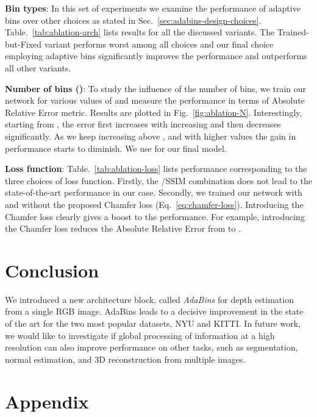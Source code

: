 \documentclass[final]{cvpr}
\begin{document}
\textbf{Bin types}:
In this set of experiments we examine the performance of adaptive bins over other choices as stated in Sec.~\ref{sec:adabins-design-choices}. Table.~\ref{tab:ablation-arch} lists results for all the discussed variants. The Trained-but-Fixed variant performs worst among all choices and our final choice employing adaptive bins significantly improves the performance and outperforms all other variants.\par

\textbf{Number of bins ()}: To study the influence of the number of bins, we train our network for various values of  and measure the performance in terms of Absolute Relative Error metric. Results are plotted in Fig.~\ref{fig:ablation-N}. Interestingly, starting from , the error first increases with increasing  and then decreases significantly. As we keep increasing  above , and with higher values the gain in performance starts to diminish. We use  for our final model.\par

\textbf{Loss function}: Table.~\ref{tab:ablation-loss} lists performance corresponding to the three choices of loss function. Firstly, the /SSIM combination does not lead to the state-of-the-art performance in our case. Secondly, we trained our network with and without the proposed Chamfer loss (Eq.~\ref{eq:chamfer-loss}). Introducing the Chamfer loss clearly gives a boost to the performance. For example, introducing the Chamfer loss reduces the Absolute Relative Error from  to .

\section{Conclusion}
We introduced a new architecture block, called \emph{AdaBins} for depth estimation from a single RGB image. AdaBins leads to a decisive improvement in the state of the art for the two most popular datasets, NYU and KITTI.
In future work, we would like to investigate if global processing of information at a high resolution can also improve performance on other tasks, such as segmentation, normal estimation, and 3D reconstruction from multiple images.





{\small


}

\appendix


\section{Appendix}
\end{document}
